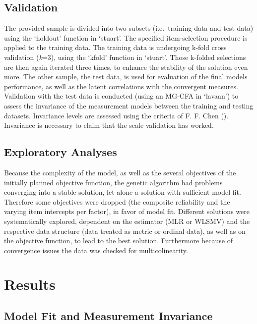 \documentclass[
  12pt,
  a4paper,
  twoside]{article}
\begin{document}
\subsection{Validation}\label{validation}

The provided sample is divided into two subsets (i.e.~training data and test data) using the `holdout' function in `stuart'. The specified item-selection procedure is applied to the training data. The training data is undergoing k-fold cross validation (\emph{k}=3), using the `kfold' function in `stuart'. Those k-folded selections are then again iterated three times, to enhance the stability of the solution even more. The other sample, the test data, is used for evaluation of the final models performance, as well as the latent correlations with the convergent measures.
Validation with the test data is conducted (using an MG-CFA in `lavaan') to assess the invariance of the measurement models between the training and testing datasets. Invariance levels are assessed using the criteria of F. F. Chen (). Invariance is necessary to claim that the scale validation has worked.

\subsection{Exploratory Analyses}\label{exploratory-analyses}

Because the complexity of the model, as well as the several objectives of the initially planned objective function, the genetic algorithm had problems converging into a stable solution, let alone a solution with sufficient model fit. Therefore some objectives were dropped (the composite reliability and the varying item intercepts per factor), in favor of model fit. Different solutions were systematically explored, dependent on the estimator (MLR or WLSMV) and the respective data structure (data treated as metric or ordinal data), as well as on the objective function, to lead to the best solution. Furthermore because of convergence issues the data was checked for multicolinearity.

\section{Results}\label{results}

\subsection{Model Fit and Measurement Invariance}\label{model-fit-and-measurement-invariance}
\end{document}
